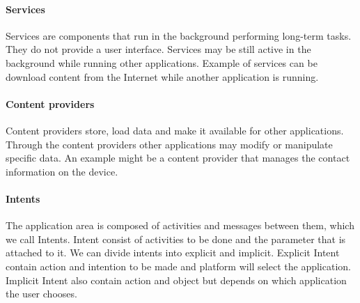 \paragraph{Services}
Services are components that run in the background performing long-term tasks. They do not provide a user interface. Services may be still active in the background while running other applications. Example of services can be download content from the Internet while another application is running.

\paragraph{Content providers} %
Content providers store, load data and make it available for other applications. Through the content providers other applications may modify or manipulate specific data. An example might be a content provider that manages the contact information on the device.

\paragraph{Intents}
The application area is composed of activities and messages between them, which we call Intents. Intent consist of activities to be done and the parameter that is attached to it. We can divide intents into explicit and implicit. Explicit Intent contain action and intention to be made and platform will select the application. Implicit Intent also contain action and object but depends on which application the user chooses.

